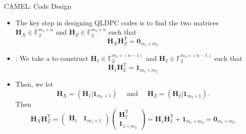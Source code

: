 \documentclass[10pt, aspectratio=169]{beamer}
\newcommand{\bH}{\mathbf{H}}
\begin{document}
\begin{frame}[c]{CAMEL: Code Design}
    \begin{itemize}
        \item The key step in designing QLDPC codes is to find the two matrices $\bH_X\in \mathbb{F}_{2}^{m_1\times n}$ and $\bH_Z\in \mathbb{F}_{2}^{m_2\times n}$ such that
        \[
            \bH_X \bH_Z^{\mathsf{T}} = \bm{0}_{m_1\times m_2}
        \]
        \item {}: We take a  to construct $\bH_1\in \mathbb{F}_{2}^{m_1\times (n-1)}$ and $\bH_2\in \mathbb{F}_{2}^{m_2\times (n-1)}$ such that
        \[
            \bH_1 \bH_2^{\mathsf{T}} = \bm{1}_{m_1\times m_2}
        \]
        \item Then, we let
        \[
            \bH_X = \left ( \bH_1 \vert \bm{1}_{m_1\times 1} \right)
            \;\;\;\;\;\text{and}\;\;\;\;\;
            \bH_Z = \left ( \bH_2 \vert \bm{1}_{m_2\times 1} \right).
        \]
        Then
        \[
            \bH_X \bH_Z^{\mathsf{T}} =
            \begin{pmatrix}
                \bH_1 & \bm{1}_{m_1\times 1}
            \end{pmatrix}
            \begin{pmatrix}
                \bH_2^{\mathsf{T}} \\ \bm{1}_{1\times m_2}
            \end{pmatrix}
            =
            \bH_1 \bH_2^{\mathsf{T}} + \bm{1}_{m_1\times m_2}
            =
            \bm{0}_{m_1\times m_2}
        \]
    \end{itemize}
\end{frame}
\end{document}
